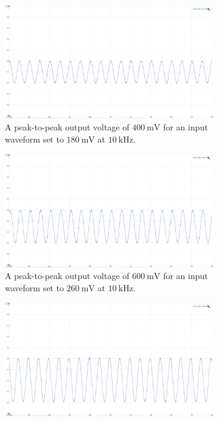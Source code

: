 \documentclass[class=report,11pt,crop=false]{standalone}
\begin{document}
	\begin{figure}[h!]
		\centering
		\begin{subfigure}{.32\textwidth}
			\centering
			\includegraphics[width=0.95\linewidth]{Figures/Results/hp141t-004Vpp-10kHz}
			\caption{A peak-to-peak output voltage of $\SI{400}{\milli\volt}$ for an input waveform set to $\SI{180}{\milli\volt}$ at $\SI{10}{\kilo\hertz}$.}
			\label{fig:hp141t-04Vpp-10kHz}
		\end{subfigure}%
		\begin{subfigure}{.32\textwidth}
			\centering
			\includegraphics[width=0.95\linewidth]{Figures/Results/hp141t-006Vpp-10kHz}
			\caption{A peak-to-peak output voltage of $\SI{600}{\milli\volt}$ for an input waveform set to $\SI{260}{\milli\volt}$ at $\SI{10}{\kilo\hertz}$.}
			\label{fig:hp141t-006Vpp-result}
		\end{subfigure}
		\begin{subfigure}{.32\textwidth}
			\centering
			\includegraphics[width=0.95\linewidth]{Figures/Results/hp141t-008Vpp-10kHz}

\end{subfigure}
\end{figure}
\end{document}
